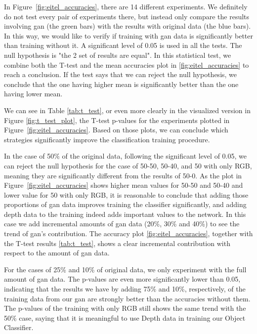 In Figure~\ref{fig:eitel_accuracies}, there are 14 different experiments. We definitely do
not test every pair of experiments there, but instead only compare the results involving
\acrshort{gan} (the green bars) with the results with original data (the blue bars). In
this way, we would like to verify if training with \acrshort{gan} data is significantly
better than training without it. A significant level of 0.05 is used in all the tests. The
null hypothesis is "the 2 set of results are equal". In this statistical test, we combine
both the T-test and the mean accuracies plot in \ref{fig:eitel_accuracies} to reach a  
conclusion. If the test says that we can reject the null hypothesis, we conclude that the
one having higher mean is significantly better than the one having lower mean.

We can see in Table \ref{tab:t_test}, or even more clearly in the visualized version in
Figure \ref{fig:t_test_plot}, the T-test p-values for the experiments plotted in
Figure~\ref{fig:eitel_accuracies}. Based on those plots, we can conclude which strategies
significantly improve the classification training procedure.

In the case of 50\% of the original data, following the significant level of 0.05, we can
reject the null hypothesis for the case of 50-50, 50-40, and 50 with only RGB, meaning
they are significantly different from the results of 50-0.  As the plot in
Figure~\ref{fig:eitel_accuracies} shows higher mean values for 50-50 and 50-40 and lower
value for 50 with only RGB, it is reasonable to conclude that adding those proportions of
\acrshort{gan} data improves training the classifier significantly, and adding depth data
to the training indeed adds important values to the network. In this case we add
incremental amounts of \acrshort{gan} data (20\%, 30\% and 40\%) to see the trend of
\acrshort{gan}'s contribution. The accuracy plot \ref{fig:eitel_accuracies}, together with
the T-test results \ref{tab:t_test}, shows a clear incremental contribution with respect
to the amount of \acrshort{gan} data.

For the cases of 25\% and 10\% of original data, we only experiment with the full amount of
\acrshort{gan} data. The p-values are even more significantly lower than 0.05, indicating
that the results we have by adding 75\% and 10\%, respectively, of the training data from
our \acrshort{gan} are strongly better than the accuracies without them. The p-values of
the training with only RGB still shows the same trend with the 50\% case, saying that it
is meaningful to use Depth data in training our Object Classifier.

